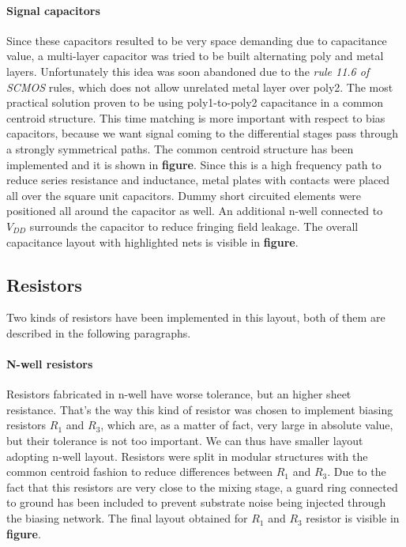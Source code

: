 \paragraph{Signal capacitors}
Since these capacitors resulted to be very space demanding due to capacitance value, a multi-layer capacitor was tried to be built alternating poly and metal layers. Unfortunately this idea was soon abandoned due to the \emph{rule 11.6 of SCMOS} rules, which does not allow unrelated metal layer over poly2. The most practical solution proven to be using poly1-to-poly2 capacitance in a common centroid structure. This time matching is more important with respect to bias capacitors, because we want signal coming to the differential stages pass through a strongly symmetrical paths.
The common centroid structure has been implemented and it is shown in \textbf{figure}. 
Since this is a high frequency path to reduce series resistance and inductance, metal plates with contacts were placed all over the square unit capacitors. Dummy short circuited elements were positioned all around the capacitor as well. An additional n-well connected to \(V_{DD}\) surrounds the capacitor to reduce fringing field leakage. The overall capacitance layout with highlighted nets is visible in \textbf{figure}.

\subsection{Resistors}
Two kinds of resistors have been implemented in this layout, both of them are described in the following paragraphs.
\paragraph{N-well resistors}
Resistors fabricated in n-well have worse tolerance, but an higher sheet resistance. That's the way this kind of resistor was chosen to implement biasing resistors \(R_1\) and \(R_3\), which are, as a matter of fact, very large in absolute value, but their tolerance is not too important. We can thus have smaller layout adopting n-well layout. Resistors were split in modular structures with the common centroid fashion to reduce differences between \(R_1\) and \(R_3\). Due to the fact that this resistors are very close to the mixing stage, a guard ring connected to ground has been included to prevent substrate noise being injected through the biasing network. The final layout obtained for \(R_1\) and \(R_3\) resistor is visible in \textbf{figure}. 

